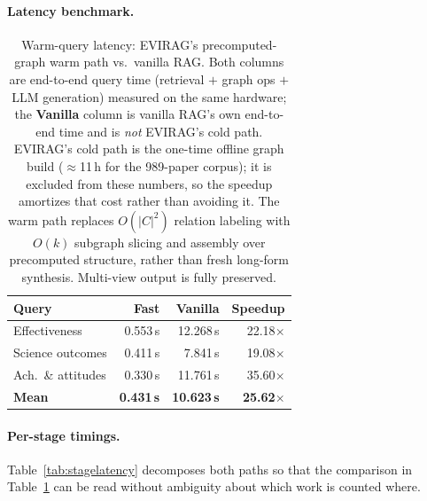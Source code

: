 \documentclass[11pt]{article}
\newcommand{\system}{\textsc{EVIRAG}\xspace}
\begin{document}
\paragraph{Latency benchmark.}
\begin{table}[h]
\centering\small
\begin{tabular}{@{}lrrr@{}}
\toprule
\textbf{Query} & \textbf{Fast} & \textbf{Vanilla} & \textbf{Speedup} \\
\midrule
Effectiveness      & 0.553\,s & 12.268\,s & 22.18$\times$ \\
Science outcomes   & 0.411\,s &  7.841\,s & 19.08$\times$ \\
Ach.\ \& attitudes & 0.330\,s & 11.761\,s & 35.60$\times$ \\
\midrule
\textbf{Mean}      & \textbf{0.431\,s} & \textbf{10.623\,s} & \textbf{25.62$\times$} \\
\bottomrule
\end{tabular}
\caption{Warm-query latency: \system's precomputed-graph warm path vs.\ vanilla
RAG.  Both columns are end-to-end query time (retrieval $+$ graph ops $+$ LLM
generation) measured on the same hardware; the \textbf{Vanilla} column is
vanilla RAG's own end-to-end time and is \emph{not} \system's cold path.
\system's cold path is the one-time offline graph build ($\approx$11\,h for the
989-paper corpus); it is excluded from these numbers, so the speedup amortizes
that cost rather than avoiding it.  The warm path replaces $O(|C|^2)$ relation
labeling with $O(k)$ subgraph slicing and assembly over precomputed structure,
rather than fresh long-form synthesis.  Multi-view output is fully preserved.}
\label{tab:latency}
\end{table}

\paragraph{Per-stage timings.}
Table~\ref{tab:stagelatency} decomposes both paths so that the comparison in
Table~\ref{tab:latency} can be read without ambiguity about which work is
counted where.
\end{document}
